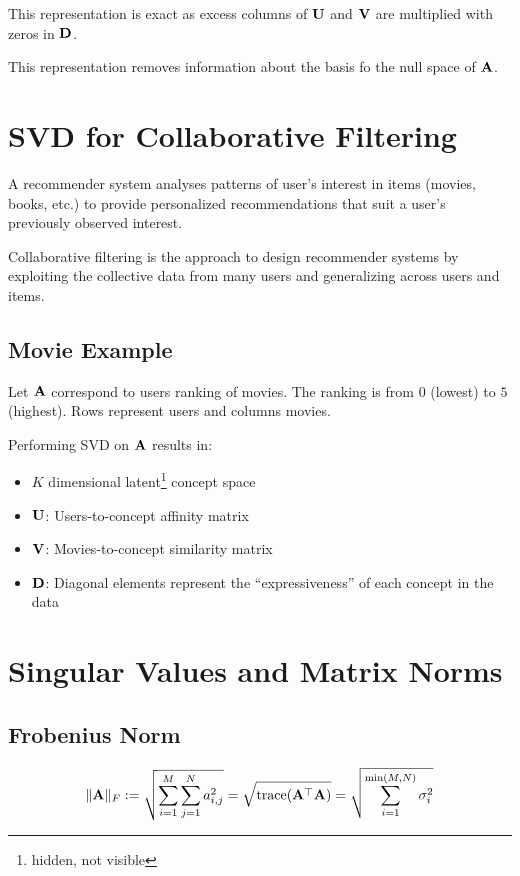 This representation is exact as excess columns of \(\mathbf{U}\) and \(\mathbf{V}\) are multiplied with zeros in \(\mathbf{D}\).

This representation removes information about the basis fo the null space of \(\mathbf{A}\).

\section{SVD for Collaborative Filtering}
\begin{definition}
A recommender system analyses  patterns of user's interest in items (movies, books, etc.) to provide personalized recommendations that suit a user's previously observed interest. 
\end{definition}

\begin{definition}
Collaborative filtering is the approach to design recommender systems by exploiting the collective data from many users and generalizing across users and items.
\end{definition}

\subsection{Movie Example}
Let \(\mathbf{A}\) correspond to users ranking of movies. The ranking is from \(0\) (lowest) to \(5\) (highest). Rows represent users and columns movies.

Performing SVD on \(\mathbf{A}\) results in:
\begin{itemize}
\item \(K\) dimensional latent\footnote{hidden, not visible} concept space
\item \(\mathbf{U}\): Users-to-concept affinity matrix
\item \(\mathbf{V}\): Movies-to-concept similarity matrix
\item \(\mathbf{D}\): Diagonal elements represent the ``expressiveness'' of each concept in the data
\end{itemize}

\section{Singular Values and Matrix Norms}
\subsection{Frobenius Norm}
\begin{definition}
\[
\| \mathbf{A} \|_F := \sqrt{\sum_{i=1}^M \sum_{j=1}^N a_{i,j}^2} = \sqrt{\operatorname{trace}(\mathbf{A}^\top \mathbf{A})} = \sqrt{\sum_{i=1}^{\min(M,N)} \sigma_i^2}
\]
\end{definition}

